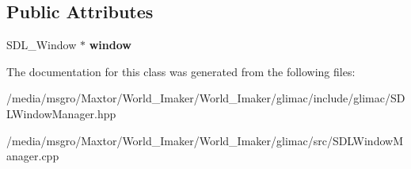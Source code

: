 \subsection*{Public Attributes}
\begin{DoxyCompactItemize}
\item 
\mbox{\label{classglimac_1_1SDLWindowManager_a5999492fdc73a660c624015485a8a71e}} 
S\+D\+L\+\_\+\+Window $\ast$ {\bfseries window}
\end{DoxyCompactItemize}


The documentation for this class was generated from the following files\+:\begin{DoxyCompactItemize}
\item 
/media/msgro/\+Maxtor/\+World\+\_\+\+Imaker/\+World\+\_\+\+Imaker/glimac/include/glimac/S\+D\+L\+Window\+Manager.\+hpp\item 
/media/msgro/\+Maxtor/\+World\+\_\+\+Imaker/\+World\+\_\+\+Imaker/glimac/src/S\+D\+L\+Window\+Manager.\+cpp\end{DoxyCompactItemize}
